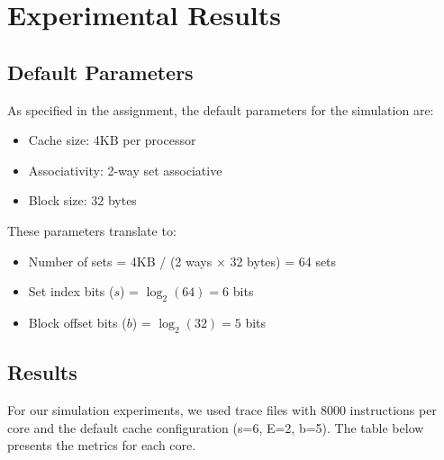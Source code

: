 \documentclass[11pt,a4paper]{article}
\begin{document}
    \section{Experimental Results}

    \subsection{Default Parameters}

    As specified in the assignment, the default parameters for the simulation are:
    \begin{itemize}[leftmargin=*]
        \item Cache size: 4KB per processor
        \item Associativity: 2-way set associative
        \item Block size: 32 bytes
    \end{itemize}

    These parameters translate to:
    \begin{itemize}[leftmargin=*]
        \item Number of sets = 4KB / (2 ways × 32 bytes) = 64 sets
        \item Set index bits ($s$) = $\log_2(64) = 6$ bits
        \item Block offset bits ($b$) = $\log_2(32) = 5$ bits
    \end{itemize}

    \subsection{Results}

    For our simulation experiments, we used trace files with 8000 instructions per core and the default cache configuration (s=6, E=2, b=5). The table below presents the metrics for each core.
\end{document}
